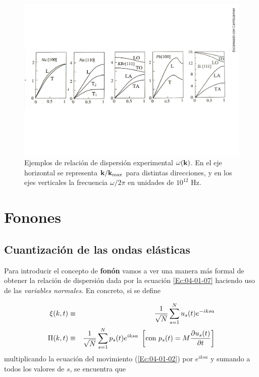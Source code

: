 \begin{figure}[h!] \centering
    \includegraphics[scale=0.42]{Cuerpo/Ch_04/Fotos libro 7.pdf}
    \caption{Ejemplos de relación de dispersión experimental $\omega (\mathbf{k})$. En el eje horizontal se representa $\mathbf{k}/\mathbf{k}_{\max}$ para distintas direcciones, y en los ejes verticales la frecuencia $\omega/2\pi$ en unidades de $10^{12}$ Hz.}
    \label{Fig:04-07}
\end{figure}    

\section{Fonones}

\subsection{Cuantización de las ondas elásticas}

Para introducir el concepto de \textbf{fonón} vamos a ver una manera más formal de obtener la relación de dispersión dada por la ecuación \ref{Ec:04-01-07} haciendo uso de las \textit{variables normales}. En concreto, si se define 

\begin{eqnarray}
    \xi (k,t) & \equiv & \frac{1}{\sqrt{N}} \sum_{s=1}^N u_s (t) e^{-iksa} \\
    \Pi (k,t) & \equiv & \frac{1}{\sqrt{N}} \sum_{s=1}^N p_s (t) e^{iksa} \ \left[ \text{con} \ p_s (t) = M \frac{\partial u_s(t)}{\partial t} \right]
\end{eqnarray}
multiplicando la ecuación del movimiento (\ref{Ec:04-01-02}) por $e^{iksa}$ y sumando a todos los valores de $s$, se encuentra que

